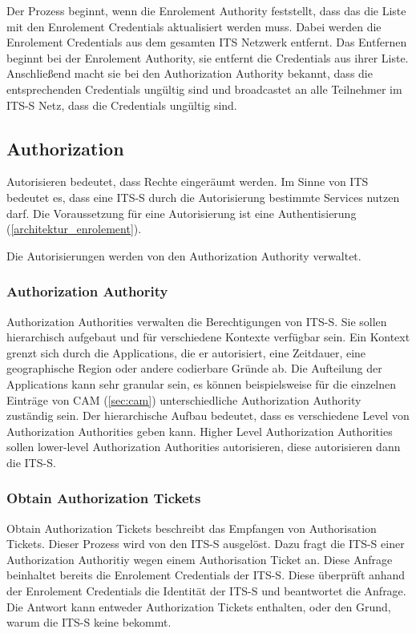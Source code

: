 Der Prozess beginnt, wenn die Enrolement Authority feststellt, dass das die Liste mit den Enrolement Credentials aktualisiert werden muss. Dabei werden die Enrolement Credentials aus dem gesamten \ac{ITS} Netzwerk entfernt. Das Entfernen beginnt bei der  Enrolement Authority, sie entfernt die Credentials aus ihrer Liste. Anschließend macht sie bei den    Authorization Authority bekannt, dass die entsprechenden Credentials ungültig sind und broadcastet an alle Teilnehmer im \ac{ITS-S} Netz, dass die Credentials ungültig sind.


\subsection{Authorization \label{architektur_authorization}}

Autorisieren bedeutet, dass Rechte eingeräumt werden. Im Sinne von \ac{ITS} bedeutet es, dass eine \ac{ITS-S} durch die Autorisierung bestimmte Services nutzen darf. Die Voraussetzung für eine Autorisierung ist eine Authentisierung (\autoref{architektur_enrolement}). 

Die Autorisierungen werden von den Authorization Authority verwaltet.
\subsubsection{Authorization Authority}
Authorization Authorities verwalten die Berechtigungen von \ac{ITS-S}. Sie  sollen hierarchisch aufgebaut und für verschiedene Kontexte ver\-füg\-bar sein. Ein Kontext grenzt sich durch die  Applications, die er autorisiert, eine Zeitdauer, eine geographische Region oder andere codierbare Gründe ab. Die Aufteilung der Applications kann sehr granular sein, es können beispielsweise für die einzelnen Einträge von \ac{CAM} (\autoref{sec:cam}) unterschiedliche Authorization Authority zuständig sein. Der hierarchische Aufbau bedeutet, dass es verschiedene Level von Authorization Authorities geben kann. Higher Level Authorization Authorities sollen lower-level Authorization Authorities autorisieren, diese autorisieren dann die \ac{ITS-S}. 

\subsubsection{Obtain Authorization Tickets \label{architektur_obtain-authorisation-tickets}}
Obtain Authorization Tickets beschreibt das Empfangen von Authorisation Tickets. Dieser Prozess wird von den \ac{ITS-S} ausgelöst. Dazu fragt die \ac{ITS-S} einer Authorization Authoritiy wegen einem Authorisation Ticket an. Diese Anfrage beinhaltet bereits die Enrolement Credentials der \ac{ITS-S}. Diese überprüft anhand der Enrolement Credentials die Identität der \ac{ITS-S} und beantwortet die Anfrage. Die Antwort kann entweder  Authorization Tickets enthalten, oder den Grund, warum die \ac{ITS-S} keine bekommt.


